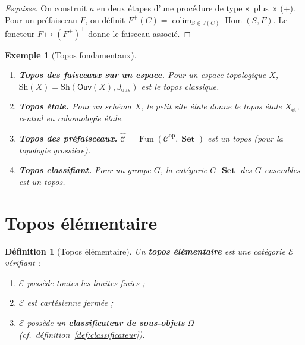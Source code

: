 \documentclass[a4paper,12pt]{book}
\DeclareMathOperator{\Hom}{Hom}
\DeclareMathOperator{\Fun}{Fun}
\DeclareMathOperator{\colim}{colim}
\DeclareMathOperator{\Set}{\mathbf{Set}}
\newcommand{\op}{\mathrm{op}}
\newtheorem{definition}[theoreme]{Définition}
\newtheorem{exemple}[theoreme]{Exemple}
\begin{document}
\begin{proof}[Esquisse]
On construit $a$ en deux étapes d'une procédure de type «~plus~» ($+$).
Pour un préfaisceau $F$, on définit
$F^+(C) = \colim_{S \in J(C)} \Hom(S, F)$.
Le foncteur $F \mapsto (F^+)^+$ donne le faisceau associé.
\end{proof}

\begin{exemple}[Topos fondamentaux]\label{ex:topos}
\begin{enumerate}[label=(\roman*)]
\item \textbf{Topos des faisceaux sur un espace.}
      Pour un espace topologique $X$,
      $\mathrm{Sh}(X) = \mathrm{Sh}(\mathsf{Ouv}(X), J_{\text{ouv}})$
      est le topos classique.

\item \textbf{Topos étale.}
      Pour un schéma $X$, le petit site étale donne le topos étale
      $X_{\text{ét}}$, central en cohomologie étale.

\item \textbf{Topos des préfaisceaux.}
      $\widehat{\mathcal{C}} = \Fun(\mathcal{C}^\op, \Set)$ est un
      topos (pour la topologie grossière).

\item \textbf{Topos classifiant.}
      Pour un groupe $G$, la catégorie $G\text{-}\Set$ des $G$-ensembles
      est un topos.
\end{enumerate}
\end{exemple}

\section{Topos élémentaire}\label{sec:topos-elementaire}

\begin{definition}[Topos élémentaire]\label{def:topos-elementaire}
Un \textbf{topos élémentaire} est une catégorie $\mathcal{E}$ vérifiant :
\begin{enumerate}[label=(\roman*)]
\item $\mathcal{E}$ possède toutes les limites finies ;
\item $\mathcal{E}$ est cartésienne fermée ;
\item $\mathcal{E}$ possède un \textbf{classificateur de sous-objets}
      $\Omega$ (cf.\ définition~\ref{def:classificateur}).
\end{enumerate}
\end{definition}
\end{document}
